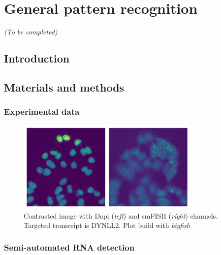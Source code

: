 \section{General pattern recognition}
\label{sec:general_pattern_recognition}

\begin{center}
	\textit{(To be completed)}
\end{center}

\subsection{Introduction}
\label{subsec:introduction_general_pattern}

\subsection{Materials and methods}
\label{subsec:materials_general_pattern}

\subsubsection{Experimental data}

\begin{figure}[h]
    \centering
    \includegraphics[width=0.8\textwidth]{figures/chapter5/FoV_DYNLL2}
    \caption{Contrasted image with Dapi (\textit{left}) and smFISH (\textit{right}) channels.
	Targeted transcript is DYNLL2.
	Plot build with \emph{bigfish}}
    \label{fig:fov_racha}
\end{figure}

\subsubsection{Semi-automated RNA detection}

